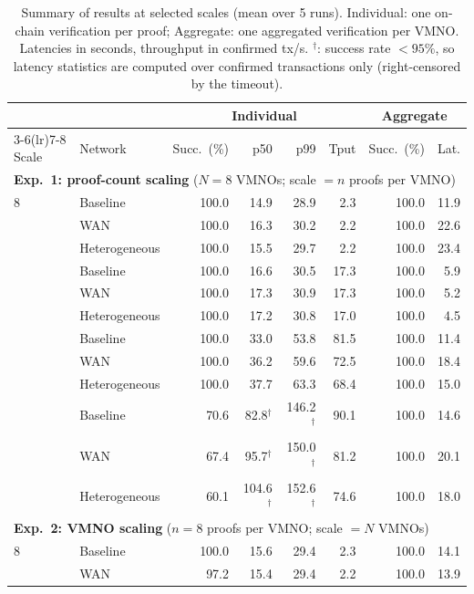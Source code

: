 \begin{table}[t]
\centering
\footnotesize
\caption{Summary of results at selected scales (mean over 5 runs). Individual: one on-chain verification per proof; Aggregate: one aggregated verification per VMNO. Latencies in seconds, throughput in confirmed tx/s. $^\dagger$: success rate $<95\%$, so latency statistics are computed over confirmed transactions only (right-censored by the timeout).}
\label{tab:summary}
\begin{tabular}{@{}llrrrrrr@{}}
\toprule
 & & \multicolumn{4}{c}{Individual} & \multicolumn{2}{c}{Aggregate} \\
\cmidrule(lr){3-6}\cmidrule(lr){7-8}
Scale & Network & Succ.\ (\%) & p50 & p99 & Tput & Succ.\ (\%) & Lat. \\
\midrule
\multicolumn{8}{l}{\textbf{Exp.~1: proof-count scaling} ($N=8$ VMNOs; scale $=n$ proofs per VMNO)} \\
\midrule
8 & Baseline & 100.0 & 14.9 & 28.9 & 2.3 & 100.0 & 11.9 \\
 & WAN & 100.0 & 16.3 & 30.2 & 2.2 & 100.0 & 22.6 \\
 & Heterogeneous & 100.0 & 15.5 & 29.7 & 2.2 & 100.0 & 23.4 \\
\addlinespace[2pt]
64 & Baseline & 100.0 & 16.6 & 30.5 & 17.3 & 100.0 & 5.9 \\
 & WAN & 100.0 & 17.3 & 30.9 & 17.3 & 100.0 & 5.2 \\
 & Heterogeneous & 100.0 & 17.2 & 30.8 & 17.0 & 100.0 & 4.5 \\
\addlinespace[2pt]
512 & Baseline & 100.0 & 33.0 & 53.8 & 81.5 & 100.0 & 11.4 \\
 & WAN & 100.0 & 36.2 & 59.6 & 72.5 & 100.0 & 18.4 \\
 & Heterogeneous & 100.0 & 37.7 & 63.3 & 68.4 & 100.0 & 15.0 \\
\addlinespace[2pt]
2048 & Baseline & 70.6 & 82.8$^\dagger$ & 146.2$^\dagger$ & 90.1 & 100.0 & 14.6 \\
 & WAN & 67.4 & 95.7$^\dagger$ & 150.0$^\dagger$ & 81.2 & 100.0 & 20.1 \\
 & Heterogeneous & 60.1 & 104.6$^\dagger$ & 152.6$^\dagger$ & 74.6 & 100.0 & 18.0 \\
\midrule
\multicolumn{8}{l}{\textbf{Exp.~2: VMNO scaling} ($n=8$ proofs per VMNO; scale $=N$ VMNOs)} \\
\midrule
8 & Baseline & 100.0 & 15.6 & 29.4 & 2.3 & 100.0 & 14.1 \\
 & WAN & 97.2 & 15.4 & 29.4 & 2.2 & 100.0 & 13.9 \\

\end{tabular}
\end{table}
